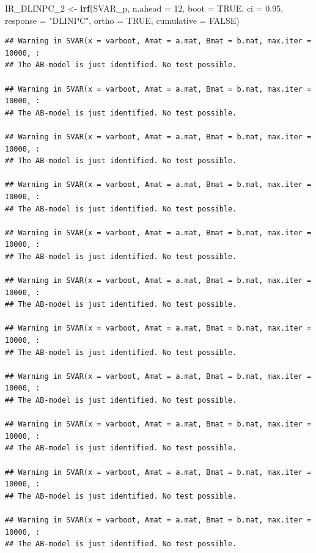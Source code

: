 \documentclass[
]{book}
\newenvironment{Shaded}{\begin{snugshade}}{\end{snugshade}}
\newcommand{\AttributeTok}[1]{\textcolor[rgb]{0.13,0.29,0.53}{#1}}
\newcommand{\ConstantTok}[1]{\textcolor[rgb]{0.56,0.35,0.01}{#1}}
\newcommand{\DecValTok}[1]{\textcolor[rgb]{0.00,0.00,0.81}{#1}}
\newcommand{\FloatTok}[1]{\textcolor[rgb]{0.00,0.00,0.81}{#1}}
\newcommand{\FunctionTok}[1]{\textcolor[rgb]{0.13,0.29,0.53}{\textbf{#1}}}
\newcommand{\NormalTok}[1]{#1}
\newcommand{\OtherTok}[1]{\textcolor[rgb]{0.56,0.35,0.01}{#1}}
\newcommand{\StringTok}[1]{\textcolor[rgb]{0.31,0.60,0.02}{#1}}
\begin{document}
\begin{Shaded}
\begin{Highlighting}[]
\NormalTok{IR\_DLINPC\_2 }\OtherTok{\textless{}{-}} \FunctionTok{irf}\NormalTok{(SVAR\_p, }\AttributeTok{n.ahead =} \DecValTok{12}\NormalTok{, }\AttributeTok{boot =} \ConstantTok{TRUE}\NormalTok{, }
                   \AttributeTok{ci =} \FloatTok{0.95}\NormalTok{, }\AttributeTok{response =} \StringTok{"DLINPC"}\NormalTok{,}
                   \AttributeTok{ortho =} \ConstantTok{TRUE}\NormalTok{, }\AttributeTok{cumulative =} \ConstantTok{FALSE}\NormalTok{)}
\end{Highlighting}
\end{Shaded}

\begin{verbatim}
## Warning in SVAR(x = varboot, Amat = a.mat, Bmat = b.mat, max.iter = 10000, :
## The AB-model is just identified. No test possible.

## Warning in SVAR(x = varboot, Amat = a.mat, Bmat = b.mat, max.iter = 10000, :
## The AB-model is just identified. No test possible.

## Warning in SVAR(x = varboot, Amat = a.mat, Bmat = b.mat, max.iter = 10000, :
## The AB-model is just identified. No test possible.

## Warning in SVAR(x = varboot, Amat = a.mat, Bmat = b.mat, max.iter = 10000, :
## The AB-model is just identified. No test possible.

## Warning in SVAR(x = varboot, Amat = a.mat, Bmat = b.mat, max.iter = 10000, :
## The AB-model is just identified. No test possible.

## Warning in SVAR(x = varboot, Amat = a.mat, Bmat = b.mat, max.iter = 10000, :
## The AB-model is just identified. No test possible.

## Warning in SVAR(x = varboot, Amat = a.mat, Bmat = b.mat, max.iter = 10000, :
## The AB-model is just identified. No test possible.

## Warning in SVAR(x = varboot, Amat = a.mat, Bmat = b.mat, max.iter = 10000, :
## The AB-model is just identified. No test possible.

## Warning in SVAR(x = varboot, Amat = a.mat, Bmat = b.mat, max.iter = 10000, :
## The AB-model is just identified. No test possible.

## Warning in SVAR(x = varboot, Amat = a.mat, Bmat = b.mat, max.iter = 10000, :
## The AB-model is just identified. No test possible.

## Warning in SVAR(x = varboot, Amat = a.mat, Bmat = b.mat, max.iter = 10000, :
## The AB-model is just identified. No test possible.


\end{verbatim}
\end{document}
